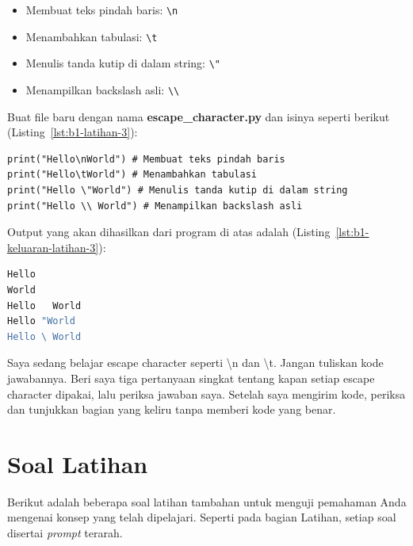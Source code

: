 \begin{enumerate}
\begin{itemize}
    \item Membuat teks pindah baris: \texttt{\textbackslash n}
    \item Menambahkan tabulasi: \texttt{\textbackslash t}
    \item Menulis tanda kutip di dalam string: \texttt{\textbackslash "}
    \item Menampilkan backslash asli: \texttt{\textbackslash\textbackslash}
\end{itemize}

Buat file baru dengan nama \textbf{escape_character.py} dan isinya seperti berikut (Listing~\ref{lst:b1-latihan-3}):

\begin{lstlisting}[style=PythonStyle, caption={Latihan 3}, label={lst:b1-latihan-3}]
print("Hello\nWorld") # Membuat teks pindah baris
print("Hello\tWorld") # Menambahkan tabulasi
print("Hello \"World") # Menulis tanda kutip di dalam string
print("Hello \\ World") # Menampilkan backslash asli
\end{lstlisting}

Output yang akan dihasilkan dari program di atas adalah (Listing~\ref{lst:b1-keluaran-latihan-3}):

\begin{lstlisting}[language=bash, caption={Keluaran Latihan 3}, label={lst:b1-keluaran-latihan-3}]
Hello
World
Hello   World
Hello "World
Hello \ World
\end{lstlisting}
  \begin{promptterarah}
  Saya sedang belajar escape character seperti \textbackslash n dan \textbackslash t. Jangan tuliskan kode jawabannya. Beri saya tiga pertanyaan singkat tentang kapan setiap escape character dipakai, lalu periksa jawaban saya. Setelah saya mengirim kode, periksa dan tunjukkan bagian yang keliru tanpa memberi kode yang benar.
  \end{promptterarah}
\end{enumerate}

\section{Soal Latihan}

Berikut adalah beberapa soal latihan tambahan untuk menguji pemahaman Anda mengenai konsep yang telah dipelajari. Seperti pada bagian Latihan, setiap soal disertai \textit{prompt} terarah.

